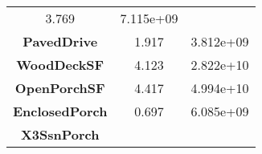 \documentclass[]{article}
\begin{document}
\begin{longtable}[c]{@{}ccc@{}}
\begin{minipage}[t]{0.16\columnwidth}
3.769
\strut\end{minipage} &
\begin{minipage}[t]{0.19\columnwidth}\centering\strut
7.115e+09
\strut\end{minipage}\tabularnewline
\begin{minipage}[t]{0.25\columnwidth}\centering\strut
\textbf{PavedDrive}
\strut\end{minipage} &
\begin{minipage}[t]{0.16\columnwidth}\centering\strut
1.917
\strut\end{minipage} &
\begin{minipage}[t]{0.19\columnwidth}\centering\strut
3.812e+09
\strut\end{minipage}\tabularnewline
\begin{minipage}[t]{0.25\columnwidth}\centering\strut
\textbf{WoodDeckSF}
\strut\end{minipage} &
\begin{minipage}[t]{0.16\columnwidth}\centering\strut
4.123
\strut\end{minipage} &
\begin{minipage}[t]{0.19\columnwidth}\centering\strut
2.822e+10
\strut\end{minipage}\tabularnewline
\begin{minipage}[t]{0.25\columnwidth}\centering\strut
\textbf{OpenPorchSF}
\strut\end{minipage} &
\begin{minipage}[t]{0.16\columnwidth}\centering\strut
4.417
\strut\end{minipage} &
\begin{minipage}[t]{0.19\columnwidth}\centering\strut
4.994e+10
\strut\end{minipage}\tabularnewline
\begin{minipage}[t]{0.25\columnwidth}\centering\strut
\textbf{EnclosedPorch}
\strut\end{minipage} &
\begin{minipage}[t]{0.16\columnwidth}\centering\strut
0.697
\strut\end{minipage} &
\begin{minipage}[t]{0.19\columnwidth}\centering\strut
6.085e+09
\strut\end{minipage}\tabularnewline
\begin{minipage}[t]{0.25\columnwidth}\centering\strut
\textbf{X3SsnPorch}
\strut\end{minipage} &
\begin{minipage}[t]{0.16\columnwidth}\centering\strut

\end{minipage}
\end{longtable}
\end{document}
